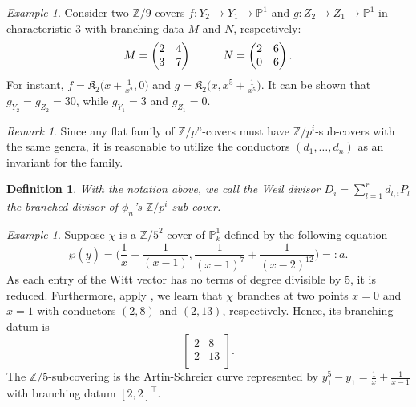 \documentclass{compositio}
\newcommand{\mat}[1]{\todo[color=green]{MH: #1}}
\newtheorem{definition}[theorem]{Definition}
\theoremstyle{remark}
\newtheorem{example}[theorem]{Example}
\theoremstyle{remark}
\newtheorem{remark}[theorem]{Remark}
\DeclareMathOperator{\ASW}{\mathcal{ASW}}
\begin{document}
\begin{example}
    \label{examplesameendsdifferent}
Consider two $\mathbb{Z}/9$-covers $f: Y_2 \rightarrow Y_1 \rightarrow \mathbb{P}^1$ and $g: Z_2 \rightarrow Z_1 \rightarrow \mathbb{P}^1$ in characteristic 3 with branching data $M$ and $N$, respectively:
\begin{equation*}
M=\begin{pmatrix}
2 & 4 \\
3 & 7 \\
\end{pmatrix} \hspace{10mm} N=\begin{pmatrix}
2 & 6 \\
0 & 6 \\
\end{pmatrix}.
\end{equation*}
For instant, $f=\mathfrak{K}_{2}\big(x+\frac{1}{x^2}, 0\big)$ and $g=\mathfrak{K}_2\big(x, x^5+\frac{1}{x^5} \big)$. It can be shown that $g_{Y_2}=g_{Z_2}=30$, while $g_{Y_1}=3$ and $g_{Z_1}=0$.
\end{example}

\begin{remark}
    Since any flat family of $\mathbb{Z}/p^n$-covers must have $\mathbb{Z}/p^i$-sub-covers with the same genera, it is reasonable to utilize the conductors $(d_1, \ldots, d_n)$ as an invariant for the family.
\end{remark}



\begin{definition}
With the notation above, we call the Weil divisor $D_i=\sum_{l=1}^r d_{l,i} P_l$ the \textit{branched divisor} of $\phi_n$'s $\mathbb{Z}/p^i$-sub-cover.
\end{definition}

\begin{example}
Suppose $\chi$ is a $\mathbb{Z}/5^2$-cover of $\mathbb{P}^1_k$ defined by the following equation
\[ \wp(\underline{y})= \bigg( \frac{1}{x}+\frac{1}{(x-1)}, \frac{1}{(x-1)^7}+\frac{1}{(x-2)^{12}} \bigg)=:\underline{a}. \]
As each entry of the Witt vector has no terms of degree divisible by $5$, it is reduced. Furthermore, apply \cite[Theorem 1]{MR1935414}, we learn that $\chi$ branches at two points $x=0$ and $x=1$ with conductors $(2, 8)$ and $(2, 13)$, respectively. Hence, its branching datum is
\[ \begin{bmatrix}
2 & 8 \\
2 & 13 \\
\end{bmatrix}. \]
The $\mathbb{Z}/5$-subcovering is the Artin-Schreier curve represented by $y_1^5-y_1=\frac{1}{x}+\frac{1}{x-1}$ with branching datum $[2,2]^{\top}$.
\end{example}
\end{document}
